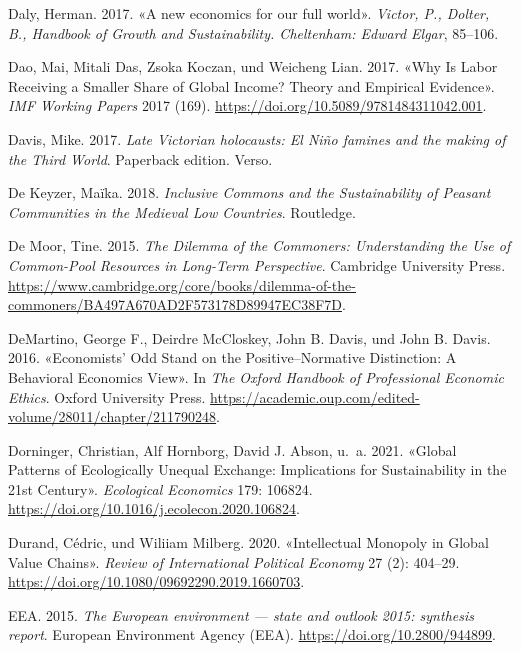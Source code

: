 \documentclass[
  nswissgerman,
  a4paper,
  DIV=11,
  numbers=noendperiod,
  oneside,
  openany]{scrreprt}
\newlength{\cslhangindent}
\newenvironment{CSLReferences}[2] %
 {\begin{list}{}{%
  \setlength{\itemindent}{0pt}
  \setlength{\leftmargin}{0pt}
  \setlength{\parsep}{0pt}
  \ifodd #1
   \setlength{\leftmargin}{\cslhangindent}
   \setlength{\itemindent}{-1\cslhangindent}
  \fi
  \setlength{\itemsep}{#2\baselineskip}}}
 {\end{list}}
\begin{document}
\begin{CSLReferences}{1}{1}
Daly, Herman. 2017. {«A new economics for our full world»}.
\emph{Victor, P., Dolter, B., Handbook of Growth and Sustainability.
Cheltenham: Edward Elgar}, 85--106.

Dao, Mai, Mitali Das, Zsoka Koczan, und Weicheng Lian. 2017. {«Why {Is}
{Labor} {Receiving} a {Smaller} {Share} of {Global} {Income}? {Theory}
and {Empirical} {Evidence}»}. \emph{IMF Working Papers} 2017 (169).
\url{https://doi.org/10.5089/9781484311042.001}.

Davis, Mike. 2017. \emph{Late Victorian holocausts: El Niño famines and
the making of the Third World}. Paperback edition. Verso.

De Keyzer, Maïka. 2018. \emph{Inclusive Commons and the Sustainability
of Peasant Communities in the Medieval Low Countries}. Routledge.

De Moor, Tine. 2015. \emph{The Dilemma of the Commoners: Understanding
the Use of Common-Pool Resources in Long-Term Perspective}. Cambridge
University Press.
\url{https://www.cambridge.org/core/books/dilemma-of-the-commoners/BA497A670AD2F573178D89947EC38F7D}.

DeMartino, George F., Deirdre McCloskey, John B. Davis, und John B.
Davis. 2016. {«Economists' Odd Stand on the Positive--Normative
Distinction: A Behavioral Economics View»}. In \emph{The Oxford Handbook
of Professional Economic Ethics}. Oxford University Press.
\url{https://academic.oup.com/edited-volume/28011/chapter/211790248}.

Dorninger, Christian, Alf Hornborg, David J. Abson, u.~a. 2021. {«Global
Patterns of Ecologically Unequal Exchange: Implications for
Sustainability in the 21st Century»}. \emph{Ecological Economics} 179:
106824. \url{https://doi.org/10.1016/j.ecolecon.2020.106824}.

Durand, Cédric, und Wiliiam Milberg. 2020. {«Intellectual Monopoly in
Global Value Chains»}. \emph{Review of International Political Economy}
27 (2): 404--29. \url{https://doi.org/10.1080/09692290.2019.1660703}.

EEA. 2015. \emph{The {European} environment --- state and outlook 2015:
synthesis report}. European Environment Agency (EEA).
\url{https://doi.org/10.2800/944899}.


\end{CSLReferences}
\end{document}
